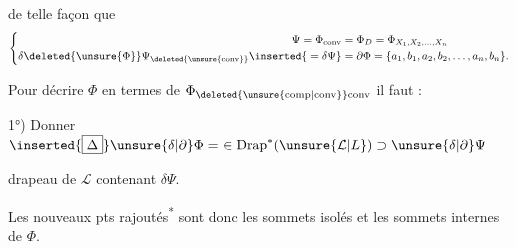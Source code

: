 de telle façon que
\[
\left\{\begin{aligned}
\Psi=\Phi_{\mathrm{conv}}&=\Phi_D=\Phi_{X_1,X_2,\ldots,X_n}\\
\delta\deleted{\unsure{\Phi}}\Psi_{\deleted{\unsure{\mathrm{conv}}}}\inserted{{}=\delta\Psi}&=\partial\Phi=\{a_1,b_1,a_2,b_2,\ldots,a_n,b_n\}.
\end{aligned}\right.
\]

Pour  décrire $\Phi$ en termes de $\Phi_{\deleted{\unsure{\mathrm{comp}|\mathrm{conv}}}\mathrm{conv}}$ il faut :

1°) Donner $\inserted{\boxed{\Delta}}\unsure{\delta|\partial}\Phi=\ \in\mathrm{Drap}^{*}(\unsure{\mathcal{L}|L})\supset\unsure{\delta|\partial}\Psi$

\hspace*{1em}drapeau de $\mathcal{L}$ contenant $\delta\Psi$.

Les nouveaux pts rajoutés\textsuperscript{*} sont donc  les  sommets isolés et les sommets internes de $\Phi$.
